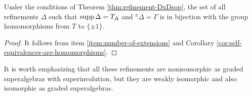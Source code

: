 
\begin{cor}\label{cor:old-item-iv}
	Under the conditions of Theorem \ref{thm:refinement-DxDsop}, the set of all refinements $\Delta$ such that $\operatorname{supp} \Delta = T_\Delta$ and ${}^\pi \Delta = \Gamma$ is in bijection with the group homomorphisms from $T$ to $\{ \pm 1 \}$.
\end{cor}

\begin{proof}
	It follows from item \eqref{item:number-of-extensions} and Corollary \ref{cor:self-equivalences-are-homomorphisms}.
\end{proof}

It is worth emphasizing that all these refinements are nonisomorphic as graded superalgebras with superinvolution, but they are weakly isomorphic and also isomorphic as graded superalgebras.



